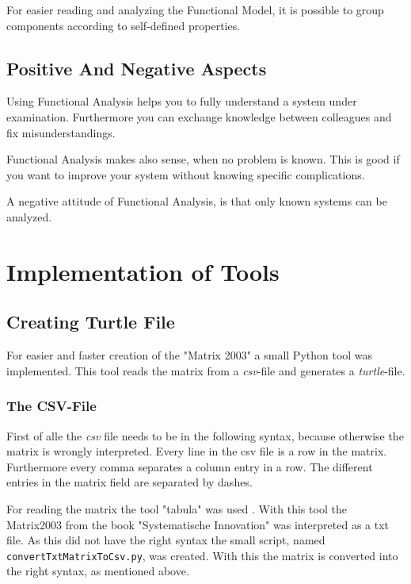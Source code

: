 \documentclass[11pt,a4paper]{article}
\begin{document}
For easier reading and analyzing the Functional Model, it is possible to group
components according to self-defined properties.

\subsection{Positive And Negative Aspects}

Using Functional Analysis helps you to fully understand a system under
examination.  Furthermore you can exchange knowledge between colleagues and
fix misunderstandings.

Functional Analysis makes also sense, when no problem is known.  This is good
if you want to improve your system without knowing specific complications.

A negative attitude of Functional Analysis, is that only known systems can be
analyzed.

\section{Implementation of Tools}

\subsection{Creating Turtle File}

For easier and faster creation of the "Matrix 2003" a small Python tool was
implemented.  This tool reads the matrix from a \emph{csv}-file and generates
a \emph{turtle}-file.

\subsubsection{The CSV-File}

First of alle the \emph{csv} file needs to be in the following syntax, because
otherwise the matrix is wrongly interpreted.  Every line in the csv file is a
row in the matrix.  Furthermore every comma separates a column entry in a row.
The different entries in the matrix field are separated by dashes.

For reading the matrix the tool "tabula" was used \cite{tabula}.  With this
tool the Matrix2003 from the book "Systematische Innovation" was interpreted
as a txt file.  As this did not have the right syntax the small script, named
\texttt{convertTxtMatrixToCsv.py}, was created.  With this the matrix is
converted into the right syntax, as mentioned above.
\end{document}
